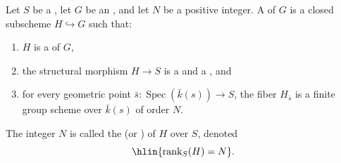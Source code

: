 \begin{definition} \label{definition:finite_flat_subgroup_scheme_of_rank_N}
    Let $S$ be a , let $G$ be an , and let $N$ be a positive integer. A  of $G$ is a closed subscheme $H \hookrightarrow G$ such that:
    \begin{enumerate}
        \item $H$ is a  of $G$,
        \item the structural morphism $H \to S$ is a  and a , and
        \item for every geometric point $\bar{s} : \operatorname{Spec}(\bar{k}(s)) \to S$, the fiber $H_{\bar{s}}$ is a finite group scheme over $\bar{k}(s)$ of order $N$.
    \end{enumerate}
    The integer $N$ is called the  (or ) of $H$ over $S$, denoted
    $$\hlin{\operatorname{rank}_S(H) = N}.$$
\end{definition}